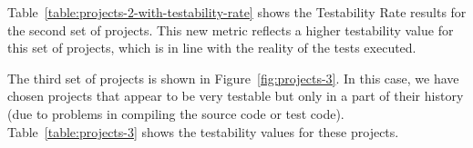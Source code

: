 Table~\ref{table:projects-2-with-testability-rate} shows the Testability Rate results for the second set of projects.
This new metric reflects a higher testability value for this set of projects, which is in line with the reality of the tests executed.

\begin{table}[h!]
    \centering
    \caption{Metrics of set of projects 1: Fastjson, Checkstyle and HikariCP (including the new Testability Rate metric)}
    \label{table:projects-2-with-testability-rate}
\end{table}


The third set of projects is shown in Figure~\ref{fig:projects-3}. 
In this case, we have chosen projects that appear to be very testable but only in a part of their history (due to problems in compiling the source code or test code).
Table~\ref{table:projects-3} shows the testability values for these projects. 

